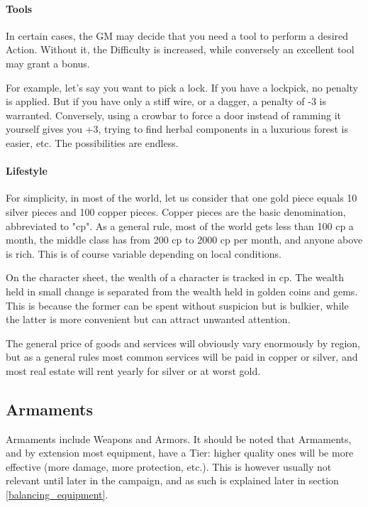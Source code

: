 \paragraph{Tools}

In certain cases, the GM may decide that you need a tool to perform a desired Action. Without it, the Difficulty is increased, while conversely an excellent tool may grant a bonus. 

For example, let's say you want to pick a lock. If you have a lockpick, no penalty is applied. But if you have only a stiff wire, or a dagger, a penalty of -3 is warranted. Conversely, using a crowbar to force a door instead of ramming it yourself gives you +3, trying to find herbal components in a luxurious forest is easier, etc. The possibilities are endless.


\paragraph{Lifestyle} 

For simplicity, in most of the world, let us consider that one gold piece equals 10 silver pieces and 100 copper pieces. Copper pieces are the basic denomination, abbreviated to "cp". As a general rule, most of the world gets less than 100 cp a month, the middle class has from 200 cp to 2000 cp per month, and anyone above is rich. This is of course variable depending on local conditions.

On the character sheet, the wealth of a character is tracked in cp. The wealth held in small change is separated from the wealth held in golden coins and gems. This is because the former can be spent without suspicion but is bulkier, while the latter is more convenient but can attract unwanted attention.

The general price of goods and services will obviously vary enormously by region, but as a general rules most common services will be paid in copper or silver, and most real estate will rent yearly for silver or at worst gold.

\subsection{Armaments}

Armaments include Weapons and Armors. It should be noted that Armaments, and by extension most equipment, have a Tier: higher quality ones will be more effective (more damage, more protection, etc.). This is however usually not relevant until later in the campaign, and as such is explained later in section \ref{balancing_equipment}.

